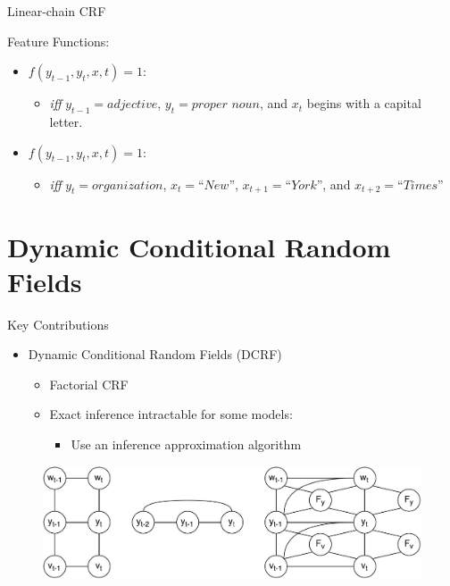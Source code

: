 \documentclass[presentation,bigger]{beamer}
\begin{document}
\begin{frame}[label={sec:orgheadline10}]{Linear-chain CRF}
\begin{block}{Feature Functions:}
\begin{itemize}
\item \(f(y_{t-1}, y_t, x, t) = 1\):
\begin{itemize}
\item \emph{iff} \(y_{t-1} = adjective\), \(y_t = \textit{proper noun}\), and \(x_t\) begins with a capital letter.
\end{itemize}
\item \(f(y_{t-1}, y_t, x, t) = 1\):
\begin{itemize}
\item \emph{iff} \(y_t = \textit{organization}\), \(x_{t} = \textit{``New''}\), \(x_{t+1} = \textit{``York''}\), and \(x_{t+2} = \textit{``Times''}\)
\end{itemize}
\end{itemize}
\end{block}
\end{frame}
\section{Dynamic Conditional Random Fields}
\label{sec:orgheadline22}
\begin{frame}[label={sec:orgheadline12}]{Key Contributions}
\begin{itemize}
\item Dynamic Conditional Random Fields (DCRF)
\begin{itemize}
\item Factorial CRF
\item Exact inference intractable for some models:
\begin{itemize}
\item Use an inference approximation algorithm
\end{itemize}
\end{itemize}
\end{itemize}
\begin{figure}[htb]
\centering
\includegraphics[width=\textwidth]{figures/DCRF.pdf}
\end{figure}
\end{frame}
\end{document}
